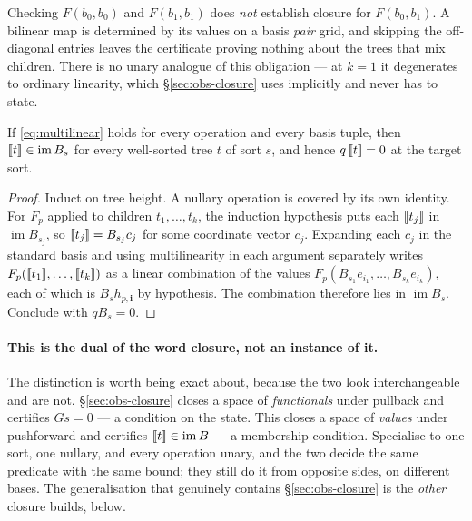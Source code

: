 \begin{remark}
Checking $F(b_0,b_0)$ and $F(b_1,b_1)$ does \emph{not} establish closure for
$F(b_0,b_1)$. A bilinear map is determined by its values on a basis \emph{pair}
grid, and skipping the off-diagonal entries leaves the certificate proving
nothing about the trees that mix children. There is no unary analogue of this
obligation --- at $k=1$ it degenerates to ordinary linearity, which
\S\ref{sec:obs-closure} uses implicitly and never has to state.
\end{remark}

\begin{theorem}\label{thm:multilinear}
If \eqref{eq:multilinear} holds for every operation and every basis tuple, then
$\mathopen{[\![}t\mathclose{]\!]}\in\operatorname{im}B_s$ for every well-sorted tree $t$ of sort $s$,
and hence $q\,\mathopen{[\![}t\mathclose{]\!]}=0$ at the target sort.
\end{theorem}
\begin{proof}
Induct on tree height. A nullary operation is covered by its own identity. For
$F_p$ applied to children $t_1,\ldots,t_k$, the induction hypothesis puts each
$\mathopen{[\![}t_j\mathclose{]\!]}$ in $\operatorname{im}B_{s_j}$, so $\mathopen{[\![}t_j\mathclose{]\!]}=B_{s_j}c_j$ for
some coordinate vector $c_j$. Expanding each $c_j$ in the standard basis and
using multilinearity in each argument separately writes
$F_p(\mathopen{[\![}t_1\mathclose{]\!]},\ldots,\mathopen{[\![}t_k\mathclose{]\!]})$ as a linear combination of the values
$F_p(B_{s_1}e_{i_1},\ldots,B_{s_k}e_{i_k})$, each of which is
$B_s h_{p,\bm i}$ by hypothesis. The combination therefore lies in
$\operatorname{im}B_s$. Conclude with $qB_s=0$.
\end{proof}

\paragraph{This is the dual of the word closure, not an instance of it.} The
distinction is worth being exact about, because the two look interchangeable
and are not. \S\ref{sec:obs-closure} closes a space of \emph{functionals} under
pullback and certifies $Gs=0$ --- a condition on the state. This closes a space
of \emph{values} under pushforward and certifies
$\mathopen{[\![}t\mathclose{]\!]}\in\operatorname{im}B$ --- a membership condition. Specialise to one
sort, one nullary, and every operation unary, and the two decide the same
predicate with the same bound; they still do it from opposite sides, on
different bases. The generalisation that genuinely contains
\S\ref{sec:obs-closure} is the \emph{other} closure  builds, below.

